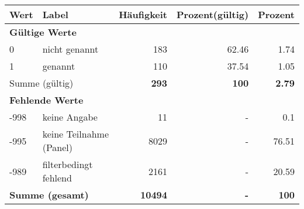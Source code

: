      \begin{longtable}{lXrrr}
     \toprule
     \textbf{Wert} & \textbf{Label} & \textbf{Häufigkeit} & \textbf{Prozent(gültig)} & \textbf{Prozent} \\
     \endhead
     \midrule
     \multicolumn{5}{l}{\textbf{Gültige Werte}}\\

     0 &
     \multicolumn{1}{X}{ nicht genannt   } &


       \num{183} &
       \num[round-mode=places,round-precision=2]{62.46} &
         \num[round-mode=places,round-precision=2]{1.74} \\

     1 &
     \multicolumn{1}{X}{ genannt   } &


       \num{110} &
       \num[round-mode=places,round-precision=2]{37.54} &
         \num[round-mode=places,round-precision=2]{1.05} \\
     \midrule
     \multicolumn{2}{l}{Summe (gültig)} &
       \textbf{\num{293}} &
     \textbf{\num{100}} &
       \textbf{\num[round-mode=places,round-precision=2]{2.79}} \\
     \multicolumn{5}{l}{\textbf{Fehlende Werte}}\\
       -998 &
       keine Angabe &
         \num{11} &
        - &
         \num[round-mode=places,round-precision=2]{0.1} \\
       -995 &
       keine Teilnahme (Panel) &
         \num{8029} &
        - &
         \num[round-mode=places,round-precision=2]{76.51} \\
       -989 &
       filterbedingt fehlend &
         \num{2161} &
        - &
         \num[round-mode=places,round-precision=2]{20.59} \\
     \midrule
     \multicolumn{2}{l}{\textbf{Summe (gesamt)}} &
          \textbf{\num{10494}} &
        \textbf{-} &
        \textbf{\num{100}} \\
     \bottomrule
     \end{longtable}
     
